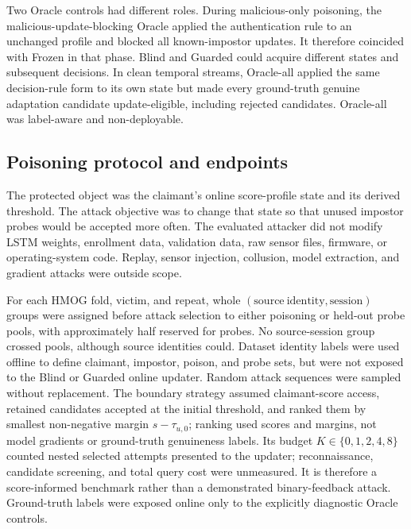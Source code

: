 \documentclass[technologies,article,submit,moreauthors]{Definitions/mdpi}
\begin{document}
Two Oracle controls had different roles. During malicious-only poisoning, the malicious-update-blocking Oracle applied the authentication rule to an unchanged profile and blocked all known-impostor updates. It therefore coincided with Frozen in that phase. Blind and Guarded could acquire different states and subsequent decisions. In clean temporal streams, Oracle-all applied the same decision-rule form to its own state but made every ground-truth genuine adaptation candidate update-eligible, including rejected candidates. Oracle-all was label-aware and non-deployable.

\subsection{Poisoning protocol and endpoints}\label{sec:poisoning-protocol-and-endpoints}

The protected object was the claimant's online score-profile state and its derived threshold. The attack objective was to change that state so that unused impostor probes would be accepted more often. The evaluated attacker did not modify LSTM weights, enrollment data, validation data, raw sensor files, firmware, or operating-system code. Replay, sensor injection, collusion, model extraction, and gradient attacks were outside scope.

For each HMOG fold, victim, and repeat, whole \((\mathrm{source\ identity},\mathrm{session})\) groups were assigned before attack selection to either poisoning or held-out probe pools, with approximately half reserved for probes. No source-session group crossed pools, although source identities could. Dataset identity labels were used offline to define claimant, impostor, poison, and probe sets, but were not exposed to the Blind or Guarded online updater. Random attack sequences were sampled without replacement. The boundary strategy assumed claimant-score access, retained candidates accepted at the initial threshold, and ranked them by smallest non-negative margin \(s-\tau_{u,0}\); ranking used scores and margins, not model gradients or ground-truth genuineness labels. Its budget \(K\in\{0,1,2,4,8\}\) counted nested selected attempts presented to the updater; reconnaissance, candidate screening, and total query cost were unmeasured. It is therefore a score-informed benchmark rather than a demonstrated binary-feedback attack. Ground-truth labels were exposed online only to the explicitly diagnostic Oracle controls.
\end{document}
